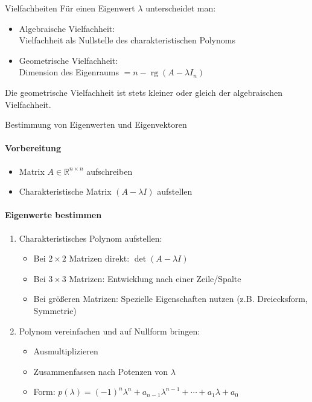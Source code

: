 \begin{concept}{Vielfachheiten}
Für einen Eigenwert $\lambda$ unterscheidet man:
\begin{itemize}
    \item Algebraische Vielfachheit: \\Vielfachheit als Nullstelle des charakteristischen Polynoms
    \item Geometrische Vielfachheit: \\Dimension des Eigenraums $= n - \operatorname{rg}(A-\lambda I_n)$
\end{itemize}
Die geometrische Vielfachheit ist stets kleiner oder gleich der algebraischen Vielfachheit.
\end{concept}

\begin{KR}{Bestimmung von Eigenwerten und Eigenvektoren}
\paragraph{Vorbereitung}
\begin{itemize}
    \item Matrix $A \in \mathbb{R}^{n \times n}$ aufschreiben
    \item Charakteristische Matrix $(A - \lambda I)$ aufstellen
\end{itemize}

\paragraph{Eigenwerte bestimmen}
\begin{enumerate}
    \item Charakteristisches Polynom aufstellen:
    \begin{itemize}
        \item Bei $2 \times 2$ Matrizen direkt: $\det(A - \lambda I)$
        \item Bei $3 \times 3$ Matrizen: Entwicklung nach einer Zeile/Spalte
        \item Bei größeren Matrizen: Spezielle Eigenschaften nutzen
              (z.B. Dreiecksform, Symmetrie)
    \end{itemize}
    
    \item Polynom vereinfachen und auf Nullform bringen:
    \begin{itemize}
        \item Ausmultiplizieren
        \item Zusammenfassen nach Potenzen von $\lambda$
        \item Form: $p(\lambda) = (-1)^n\lambda^n + a_{n-1}\lambda^{n-1} + \cdots + a_1\lambda + a_0$
    \end{itemize}


\end{enumerate}
\end{KR}
